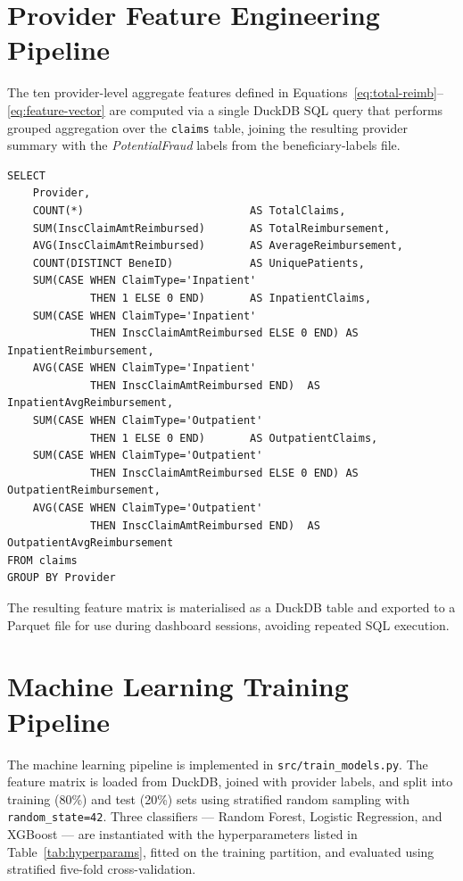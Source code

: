 \section{Provider Feature Engineering Pipeline}
\label{sec:impl-features}

The ten provider-level aggregate features defined in Equations~\ref{eq:total-reimb}--\ref{eq:feature-vector} are computed via a single DuckDB SQL query that performs grouped aggregation over the \texttt{claims} table, joining the resulting provider summary with the \textit{PotentialFraud} labels from the beneficiary-labels file.

\begin{lstlisting}
SELECT
    Provider,
    COUNT(*)                          AS TotalClaims,
    SUM(InscClaimAmtReimbursed)       AS TotalReimbursement,
    AVG(InscClaimAmtReimbursed)       AS AverageReimbursement,
    COUNT(DISTINCT BeneID)            AS UniquePatients,
    SUM(CASE WHEN ClaimType='Inpatient'
             THEN 1 ELSE 0 END)       AS InpatientClaims,
    SUM(CASE WHEN ClaimType='Inpatient'
             THEN InscClaimAmtReimbursed ELSE 0 END) AS InpatientReimbursement,
    AVG(CASE WHEN ClaimType='Inpatient'
             THEN InscClaimAmtReimbursed END)  AS InpatientAvgReimbursement,
    SUM(CASE WHEN ClaimType='Outpatient'
             THEN 1 ELSE 0 END)       AS OutpatientClaims,
    SUM(CASE WHEN ClaimType='Outpatient'
             THEN InscClaimAmtReimbursed ELSE 0 END) AS OutpatientReimbursement,
    AVG(CASE WHEN ClaimType='Outpatient'
             THEN InscClaimAmtReimbursed END)  AS OutpatientAvgReimbursement
FROM claims
GROUP BY Provider
\end{lstlisting}

The resulting feature matrix is materialised as a DuckDB table and exported to a Parquet file for use during dashboard sessions, avoiding repeated SQL execution.

\section{Machine Learning Training Pipeline}
\label{sec:impl-ml}

The machine learning pipeline is implemented in \texttt{src/train\_models.py}. The feature matrix is loaded from DuckDB, joined with provider labels, and split into training (80\%) and test (20\%) sets using stratified random sampling with \texttt{random\_state=42}. Three classifiers --- Random Forest, Logistic Regression, and XGBoost --- are instantiated with the hyperparameters listed in Table~\ref{tab:hyperparams}, fitted on the training partition, and evaluated using stratified five-fold cross-validation.

